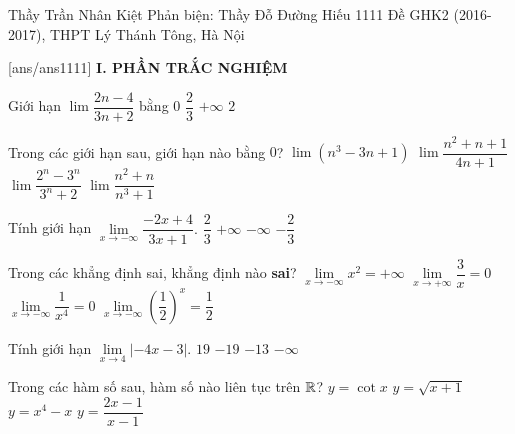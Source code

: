 \begin{name}
		{Thầy Trần Nhân Kiệt \newline  Phản biện: Thầy Đỗ Đường Hiếu}
		{1111 Đề GHK2 (2016-2017), THPT Lý Thánh Tông, Hà Nội}
	\end{name}
	\setcounter{ex}{0}
	[ans/ans1111]
\noindent\textbf{I. PHẦN TRẮC NGHIỆM}
\begin{ex}%
Giới hạn $ \lim\dfrac{2n-4}{3n+2} $ bằng
\choice
{$ 0 $}
{\True $ \dfrac{2}{3} $}
{$ +\infty $}
{$ 2 $}
\end{ex}
\begin{ex}%
Trong các giới hạn sau, giới hạn nào bằng $ 0 $?
\choice
{$ \lim(n^3-3n+1) $}
{$ \lim\dfrac{n^2+n+1}{4n+1} $}
{$ \lim\dfrac{2^n-3^n}{3^n+2} $}
{\True $ \lim\dfrac{n^2+n}{n^3+1} $}
\end{ex}
\begin{ex}%
Tính giới hạn $ \lim\limits_{x\to -\infty} \dfrac{-2x+4}{3x+1}. $
\choice
{$ \dfrac{2}{3} $}
{$ +\infty $}
{$ -\infty $}
{\True $ -\dfrac{2}{3} $}
\end{ex}
\begin{ex}%
Trong các khẳng định sai, khẳng định nào {\bf  sai}?
\choice
{$ \lim\limits_{x\to -\infty} x^2=+\infty$}
{$ \lim\limits_{x\to +\infty} \dfrac{3}{x}=0$}
{$ \lim\limits_{x\to -\infty} \dfrac{1}{x^4}=0$}
{\True $ \lim\limits_{x\to -\infty} \left(\dfrac{1}{2}\right)^x=\dfrac{1}{2}$}
\end{ex}
\begin{ex}%
Tính giới hạn $ \lim\limits_{x\to 4} |-4x-3|. $
\choice
{\True $ 19 $}
{$ -19 $}
{$ -13 $}
{$ -\infty $}
\end{ex}
\begin{ex}%
Trong các hàm số sau, hàm số nào liên tục trên $ \Bbb{R}$?
\choice
{$ y=\cot x $}
{$ y=\sqrt{x+1} $}
{\True $ y=x^4-x $}
{$ y=\dfrac{2x-1}{x-1} $}
\end{ex}
